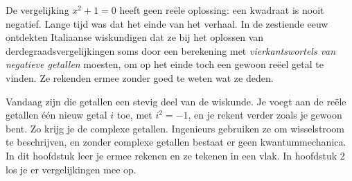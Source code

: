 %



De vergelijking $x^2 + 1 = 0$ heeft geen reële oplossing: een kwadraat is nooit negatief. Lange tijd was dat het einde van het verhaal. In de zestiende eeuw ontdekten Italiaanse wiskundigen dat ze bij het oplossen van derdegraadsvergelijkingen soms door een berekening met \textit{vierkantswortels van negatieve getallen} moesten, om op het einde toch een gewoon reëel getal te vinden. Ze rekenden ermee zonder goed te weten wat ze deden.

Vandaag zijn die getallen een stevig deel van de wiskunde. Je voegt aan de reële getallen één nieuw getal $i$ toe, met $i^2 = -1$, en je rekent verder zoals je gewoon bent. Zo krijg je de complexe getallen. Ingenieurs gebruiken ze om wisselstroom te beschrijven, en zonder complexe getallen bestaat er geen kwantummechanica. In dit hoofdstuk leer je ermee rekenen en ze tekenen in een vlak. In hoofdstuk 2 los je er vergelijkingen mee op.

\begin{oefeningen}[Start]

\end{oefeningen}


